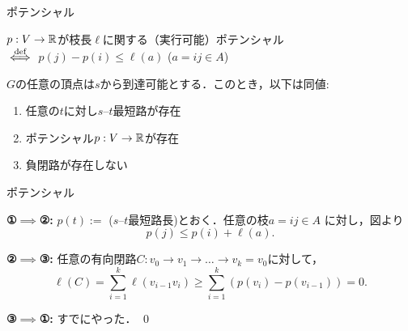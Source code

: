 \documentclass[14pt,aspectratio=169,xcolor=dvipsnames,table,onlytextwidth,dvipdfmx]{beamer}
\begin{document}
\begin{frame}{ポテンシャル}
    \begin{definition}[ポテンシャル]
        $p: V \to \mathbb{R}$が枝長$\ell$に関する\alert{（実行可能）ポテンシャル} \\ 
        $\overset{\text{def}}{\iff}$ $p(j) - p(i) \leq \ell(a)$ \quad ($a = ij \in A$)
    \end{definition}

    \begin{lemma}
        $G$の任意の頂点は$s$から到達可能とする．このとき，以下は同値: 
        \begin{enumerate}
            \item 任意の$t$に対し$s$--$t$最短路が存在
            \item ポテンシャル$p: V \to \mathbb{R}$が存在
            \item 負閉路が存在しない
        \end{enumerate}
    \end{lemma}
\end{frame}

\begin{frame}{ポテンシャル}
    \small

    \bigskip

    \textbf{①$\implies$②:} $p(t) :=$ ($s$--$t$最短路長)とおく．任意の枝$a = ij \in A$
    に対し，図より
    \[ p(j) \leq p(i) + \ell(a). \]

    \bigskip\pause
    \textbf{②$\implies$③:} 任意の有向閉路$C: v_0 \to v_1 \to \dots \to v_k = v_0$に対して，
    \[ 
        \ell(C) = \sum_{i=1}^k \ell(v_{i-1}v_i) \geq \sum_{i=1}^k (p(v_i) - p(v_{i-1})) = 0. 
    \]

    \bigskip\pause
    \textbf{③$\implies$①:} すでにやった． \qed
\end{frame}
\end{document}
